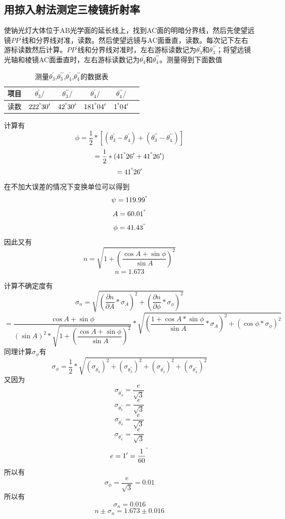 \documentclass[a4paper,11pt]{article}
\begin{document}
\subsection{用掠入射法测定三棱镜折射率}
    使钠光灯大体位于AB光学面的延长线上，找到AC面的明暗分界线，然后先使望远镜$PP^{\prime} $线和分界线对准，读数。然后使望远镜与AC面垂直，读数。每次记下左右游标读数然后计算。$PP^{\prime} $线和分界线对准时，左右游标读数记为$ \theta_{3}^{\prime } $和$ \theta_{3}^{\prime \prime} $；将望远镜光轴和棱镜AC面垂直时，左右游标读数记为$ \theta_{4}^{\prime } $和$ \theta_{4}^{\prime \prime} $。测量得到下面数值
	\begin{table}[H]
		\centering\caption{测量$\theta_{3}^{\prime }$,$\theta_{3}^{\prime \prime}$,$\theta_{4}^{\prime } $,$\theta_{4}^{\prime \prime } $的数据表}
		\small
		\begin{tabularx}{.85\linewidth}{C{1} *5{C{.8}}}
			\toprule
			\textbf{项目} &
			$\theta_{3}^{\prime } / \si{}$ &
			$\theta_{3}^{\prime \prime}/ \si{}$ &
			$\theta_{4}^{\prime }/ \si{}$ &
			$\theta_{4}^{\prime \prime} / \si{}$ & \\
			\midrule
			读数     & $ 222^{\degree}30^{\prime} $  & $ 42^{\degree}30^{\prime} $ & $ 181^{\degree}04^{\prime} $ &  $ 1^{\degree}04^{\prime} $    \\
			\bottomrule
		\end{tabularx}
		\vspace{3ex}
	\end{table}\noindent%
    计算有
    $$ \phi = \frac{1}{2} * [(\theta_{3}^{\prime } - \theta_{4}^{\prime }) + ( \theta_{3}^{\prime \prime } -\theta_{4}^{\prime \prime } )] $$
    $$ = \frac{1}{2} * (41^{\degree}26^{\prime} + 41^{\degree}26^{\prime}) $$
    $$ = 41^{\degree}26^{\prime}$$
    在不加大误差的情况下变换单位可以得到
    $$ \psi = 119.99^{\degree}$$
	$$ A = 60.01^{\degree}$$
	$$ \phi = 41.43^{\degree}$$
	因此又有
	$$ n = \sqrt{1+ (\dfrac{\cos A + \sin \phi}{\sin A})^2} $$
	$$ n = 1.673 $$
	
	计算不确定度有
	$$ \sigma_{n} = \sqrt{(\dfrac{\partial n}{\partial A} * \sigma_{A})^{2} + (\dfrac{\partial n}{\partial \phi} * \sigma_{\phi})^{2} }$$
	$$ = \dfrac{\cos A + \sin \phi}{(\sin A)^2 *\sqrt{1+(\dfrac{\cos A + \sin \phi}{\sin A})^2}} * \sqrt{(\dfrac{1+ \cos A *\sin \phi}{\sin A}*\sigma_{A})^{2} + (\cos \phi * \sigma_{\phi} )^2}$$
	同理计算$\sigma_{\phi}$有
	$$ \sigma_{\phi} = \frac{1}{2} * \sqrt{(  \sigma_{\theta_{3}^{\prime }})^{2} + (\sigma_{\theta_{3}^{\prime \prime}})^{2} + ( \sigma_{\theta_{4}^{\prime }})^{2} + (\sigma_{\theta_{4}^{\prime \prime}})^{2}} $$
	又因为
	$$ \sigma_{\theta_{3}^{\prime }} = \frac{e}{\sqrt{3}} $$
	$$ \sigma_{\theta_{3}^{\prime \prime}} = \frac{e}{\sqrt{3}} $$
	$$ \sigma_{\theta_{4}^{\prime }} = \frac{e}{\sqrt{3}} $$
	$$ \sigma_{\theta_{4}^{\prime \prime }} = \frac{e}{\sqrt{3}} $$
	$$ e = 1^{\prime} = \frac{1}{60}^{\degree} $$
	所以有
	$$\sigma_{\phi} = \frac{e}{\sqrt{3}} = 0.01$$
	所以有
	$$ \sigma_{n} = 0.016$$
	$$ n \pm \sigma_{n} = 1.673 \pm 0.016  $$
\end{document}
